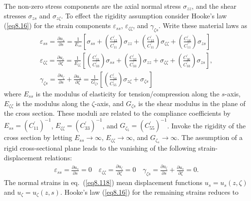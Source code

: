\documentclass{AeroStructure-ERJohnson}
\begin{document}
The non-zero stress components are the axial normal stress
$\sigma_{z z}$, and the shear stresses $\sigma_{z s}$ and
$\sigma_{z \zeta}$. To effect the rigidity assumption consider
Hooke's law (\ref{eq8.16}) for the strain components
$\varepsilon_{s s}$, $\varepsilon_{\zeta \zeta}$, and
$\gamma_{\zeta s}$. Write these material laws as
\begin{gather}\label{eq8.117}
\varepsilon_{s s} =\frac{\partial u_{s}}{\partial s}=\frac{1}{E_{s s}}\left[\sigma_{s s}+\left(\frac{C_{12}^{\prime}}{C_{11}^{\prime}}\right) \sigma_{z z}+\left(\frac{C_{13}^{\prime}}{C_{11}^{\prime}}\right) \sigma_{\zeta \zeta}+\left(\frac{C_{16}^{\prime}}{C_{11}^{\prime \prime}}\right) \sigma_{z s}\right] \nonumber\\
\varepsilon_{\zeta \zeta} =\frac{\partial u_{c}}{\partial \zeta}=\frac{1}{E_{\zeta \zeta}}\left[\left(\frac{C_{31}^{\prime}}{C_{33}^{\prime}}\right) \sigma_{s s}+\left(\frac{C_{32}^{\prime}}{C_{33}^{\prime}}\right) \sigma_{z z}+\sigma_{\zeta \zeta}+\left(\frac{C_{36}^{\prime}}{C_{33}^{\prime}}\right) \sigma_{z s}\right]\!,\\
\gamma_{\zeta s} =\frac{\partial u_{\zeta}}{\partial s}+\frac{\partial u_{s}}{\partial \zeta}=\frac{1}{G_{\zeta s}}\left[\left(\frac{C_{54}^{\prime}}{C_{55}^{\prime}}\right) \sigma_{z \zeta}+\sigma_{\zeta s}\right]\nonumber
\end{gather}
where $E_{ss}$ is the modulus of elasticity for
tension/compression along the $s$-axis, $E_{\zeta \zeta}$ is the
modulus along the $\zeta$-axis, and $G_{\zeta s}$ is the shear modulus
in the plane of the cross section. These moduli are related to the
compliance coefficients by $E_{s
s}=\left(C_{11}^{\prime}\right)^{-1}$, $E_{\zeta
\zeta}=\left(C_{33}^{\prime}\right)^{-1}$, and
$G_{\zeta_{5}}=\left(C_{55}^{\prime}\right)^{-1}$. Invoke the
rigidity of the cross section by letting $E_{ss} \rightarrow
\infty$, $E_{\zeta \zeta} \rightarrow \infty$, and $G_{\zeta_{s}}
\rightarrow \infty$. The assumption of a rigid cross-sectional
plane leads to the vanishing of the following strain-displacement
relations:
\begin{align}\label{eq8.118}
\varepsilon_{ss}=\frac{\partial u_{s}}{\partial s}=0 \quad
\varepsilon_{\zeta \zeta}=\frac{\partial u_{\zeta}}{\partial \zeta}=0
\quad \gamma_{\zeta s}=\frac{\partial u_{\zeta}}{\partial
s}+\frac{\partial u_{s}}{\partial \zeta}=0.
\end{align}
The normal strains in eq.~(\ref{eq8.118}) mean displacement
functions $u_{s}=u_{s}(z, \zeta)$ and $u_{\zeta}=u_{\zeta}(z, s)$.
Hooke's law (\ref{eq8.16}) for the remaining strains reduces to\vspace{-6pt}
\end{document}
